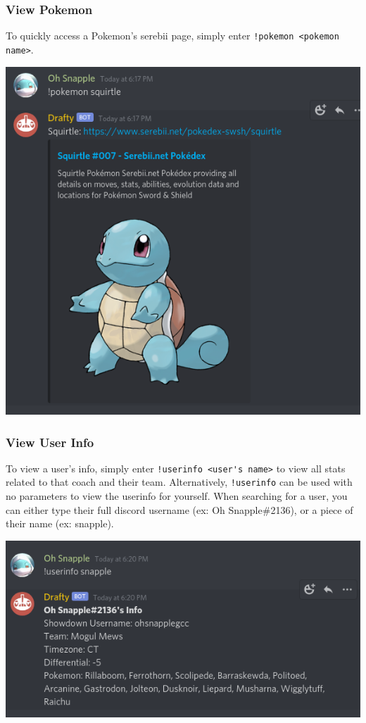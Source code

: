 \documentclass{article}
\begin{document}
\subsubsection*{View Pokemon}
To quickly access a Pokemon's serebii page, simply enter \verb|!pokemon <pokemon name>|.\\
\begin{center}
  \includegraphics[scale=.5]{pokemon.png}
\end{center}
\subsubsection*{View User Info}
To view a user's info, simply enter \verb|!userinfo <user's name>| to view all stats related to that coach and their team.
Alternatively, \verb|!userinfo| can be used with no parameters to view the userinfo for yourself.
When searching for a user, you can either type their full discord username (ex: Oh Snapple\#2136), or a piece of their name (ex: snapple).\\
\begin{center}
  \includegraphics[scale=.5]{userinfo.png}
\end{center}
\end{document}
